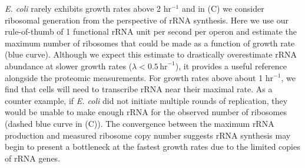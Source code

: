 \textit{E. coli} rarely exhibits growth rates above 2 hr$^{-1}$
\citep{bremer2008,roller2016} and in (C) we consider
ribosomal generation from the perspective of rRNA synthesis. Here we use our
rule-of-thumb of 1 functional rRNA unit per second per operon and estimate the
maximum number of ribosomes that could  be made as a function of growth rate
(blue curve).  Although we expect this estimate to drastically overestimate rRNA
abundance at slower growth rates ($\lambda < 0.5\, \text{hr}^{-1}$), it provides
a useful reference alongside the proteomic measurements. For growth rates above
about 1 hr$^{-1}$, we find that cells will need to transcribe rRNA near their
maximal rate. As a counter example, if \textit{E. coli} did not initiate
multiple rounds of replication, they would be unable to make enough rRNA for the
observed number of ribosomes (dashed blue curve in (C)). The
convergence between the maximum rRNA production and measured ribosome copy
number suggests rRNA synthesis may begin to present a bottleneck at the fastest
growth rates due to the limited copies of rRNA genes.
